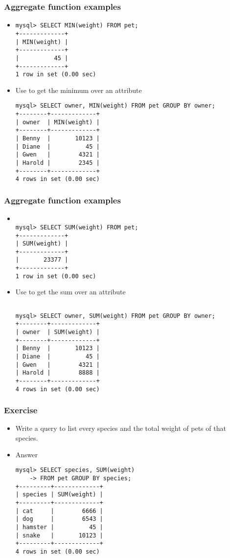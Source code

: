 \documentclass[hyperref={pdfpagelabels=false},svgnames,xcolor=table]{beamer}
\begin{document}
\begin{frame}[shrink=10,fragile]
  \frametitle{Aggregate function examples}
  \begin{itemize}
    \item {\color{blue}{MIN}}
\begin{verbatim}
mysql> SELECT MIN(weight) FROM pet;
+-------------+
| MIN(weight) |
+-------------+
|          45 |
+-------------+
1 row in set (0.00 sec)

\end{verbatim}
    \item Use {\color{blue}{GROUP BY}} to get the minimum over an attribute
\begin{verbatim}
mysql> SELECT owner, MIN(weight) FROM pet GROUP BY owner;
+--------+-------------+
| owner  | MIN(weight) |
+--------+-------------+
| Benny  |       10123 |
| Diane  |          45 |
| Gwen   |        4321 |
| Harold |        2345 |
+--------+-------------+
4 rows in set (0.00 sec)
\end{verbatim}
  \end{itemize}
\end{frame}

\begin{frame}[shrink=10,fragile]
  \frametitle{Aggregate function examples}
  \begin{itemize}
    \item {\color{blue}{SUM}}
\begin{verbatim}

mysql> SELECT SUM(weight) FROM pet;
+-------------+
| SUM(weight) |
+-------------+
|       23377 |
+-------------+
1 row in set (0.00 sec)

\end{verbatim}
    \item Use {\color{blue}{GROUP BY}} to get the sum over an attribute
\begin{verbatim}

mysql> SELECT owner, SUM(weight) FROM pet GROUP BY owner;
+--------+-------------+
| owner  | SUM(weight) |
+--------+-------------+
| Benny  |       10123 |
| Diane  |          45 |
| Gwen   |        4321 |
| Harold |        8888 |
+--------+-------------+
4 rows in set (0.00 sec)
\end{verbatim}
  \end{itemize}
\end{frame}

\begin{frame}[shrink=10,fragile]
  \frametitle{Exercise}
  \begin{itemize}
    \item Write a query to list every species and the total weight of pets of
      that species.
    \item<2-> Answer
\begin{verbatim}
mysql> SELECT species, SUM(weight) 
    -> FROM pet GROUP BY species;
+---------+-------------+
| species | SUM(weight) |
+---------+-------------+
| cat     |        6666 |
| dog     |        6543 |
| hamster |          45 |
| snake   |       10123 |
+---------+-------------+
4 rows in set (0.00 sec)
\end{verbatim}
  \end{itemize}
\end{frame}
\end{document}
